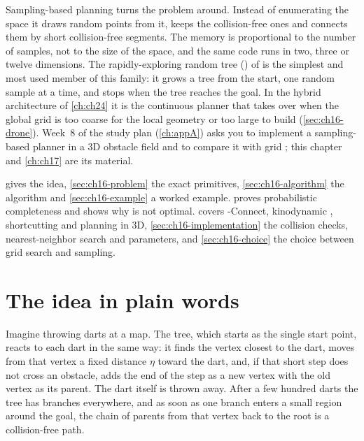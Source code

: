 Sampling-based planning turns the problem
around. Instead of enumerating the space it draws random points from it,
keeps the collision-free ones and connects them by short collision-free
segments. The memory is proportional to the number of samples, not to the
size of the space, and the same code runs in two, three or twelve
dimensions. The rapidly-exploring random tree (\rrt) of
\textcite{lavalle1998rrt} is the simplest and most used member of this
family: it grows a tree from the start, one random sample at a time, and
stops when the tree reaches the goal. In the hybrid architecture of
\cref{ch:ch24} it is the continuous planner that takes over when the global
grid is too coarse for the local geometry or too large to build
(\cref{sec:ch16-drone}). Week~8 of the study plan (\cref{ch:appA}) asks you
to implement a sampling-based planner in a 3D obstacle field and to compare
it with grid \astar; this chapter and \cref{ch:ch17} are its material.

 gives the idea, \cref{sec:ch16-problem} the exact
primitives, \cref{sec:ch16-algorithm} the algorithm and
\cref{sec:ch16-example} a worked example.  proves
probabilistic completeness and shows why \rrt is not optimal.
 covers \rrt-Connect, kinodynamic \rrt, shortcutting
and planning in 3D, \cref{sec:ch16-implementation} the collision checks,
nearest-neighbor search and parameters, and \cref{sec:ch16-choice} the
choice between grid search and sampling.

\section{The idea in plain words}
\label{sec:ch16-intuition}

Imagine throwing darts at a map. The tree, which starts as the single start
point, reacts to each dart in the same way: it finds the vertex closest to
the dart, moves from that vertex a fixed distance $\eta$ toward the dart,
and, if that short step does not cross an obstacle, adds the end of the step
as a new vertex with the old vertex as its parent. The dart itself is thrown
away. After a few hundred darts the tree has branches everywhere, and as soon
as one branch enters a small region around the goal, the chain of parents
from that vertex back to the root is a collision-free path.

